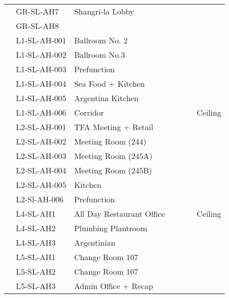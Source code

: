 {\begin{longtable}{lll c c c p{3cm}}
\inc	 	 &GR-SL-AH7	 &Shangri-la Lobby	 	&\checkmark&& &\\
\inc	 	 &GR-SL-AH8	 &	 	 	 	&\checkmark && &\\
\midrule


\inc	 	 &L1-SL-AH-001	 &Ballroom No. 2	 	&\checkmark  &\ch &\ch&\\
\inc	 	 &L1-SL-AH-002	 &Ballroom No.3	 	&\checkmark  &\ch&\ch&\snags\\

\inc	 	 &L1-SL-AH-003	 &Prefunction	 	 	&\checkmark &\ch&\ch&\snags \\
 
\inc	 	 &L1-SL-AH-004	 &Sea Food + Kitchen	&\checkmark&\ch&\ch&\snags\\
 
\inc	 	 &L1-SL-AH-005	 &Argentina Kitchen	&\checkmark &\ch&\ch&\\
 
\inc	 	 &L1-SL-AH-006	 &Corridor	 	 	&\checkmark  &&& Ceiling\\
\midrule



\inc	 	 &L2-SL-AH-001	 &TFA Meeting + Retail	&\checkmark &&& \\
\inc	 	 &L2-SL-AH-002	 &Meeting Room (244)	& \checkmark	& && \\
\inc	 	 &L2-SL-AH-003	 &Meeting Room (245A)	 &\checkmark&&	 & \\
\inc	 	 &L2-SL-AH-004	 &Meeting Room (245B)	 &\checkmark &&& \\
\inc	 	 &L2-SL-AH-005	 &Kitchen &\checkmark  &&& \\

\inc	 	 &L2-Sl-AH-006	 &Prefunction	 	&\checkmark&\ch &\ch &\snags\\

\midrule 

\inc  	 &L4-SL-AH1	 &All Day Restaurant Office	&\checkmark &   & &Ceiling\\

\inc	 	 &L4-SL-AH2	 &Plumbing Plantroom	 	&\checkmark  &\ch&\ch&\\

\inc	 	 &L4-SL-AH3	 &Argentinian	 	 	 &\checkmark &\ch&\ch&\snags\\
\midrule 

\inc 	 &L5-SL-AH1	 &Change Room 107	 	 &\checkmark & &&\\
\inc	 	 &L5-SL-AH2	 &Change Room 107	 	 &\checkmark	& & &\\
\inc	 	 &L5-SL-AH3	 &Admin Office + Recap	 &\checkmark	 &&&\\


\end{longtable}}
